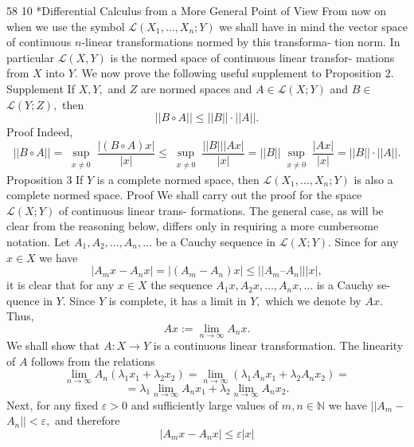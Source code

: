 58
10 *Differential Calculus from a More General Point of View
From now on when we use the symbol $\mathcal{L}(X_1, \ldots, X_n; Y)$ we shall have in mind
the vector space of continuous $n$-linear transformations normed by this transforma-
tion norm. In particular $\mathcal{L}(X, Y)$ is the normed space of continuous linear transfor-
mations from $X$ into $Y.$
We now prove the following useful supplement to Proposition 2.
Supplement If $X, Y,$ and $Z$ are normed spaces and $A \in \mathcal{L}(X; Y)$ and $B \in$
$\mathcal{L}(Y; Z),$ then
$$||B \circ A|| \le || B || \cdot || A ||.$$
Proof Indeed,
$$||B \circ A|| = \sup_{\substack{x \ne 0}} \frac{|(B \circ A)x|}{|x|} \le \sup_{\substack{x \ne 0}} \frac{|| B || |Ax|}{|x|} = || B || \sup_{\substack{x \ne 0}} \frac{|Ax|}{|x|} = || B ||\cdot || A ||.$$
Proposition 3 If $Y$ is a complete normed space, then $\mathcal{L}(X_1, \ldots, X_n; Y)$ is also a
complete normed space.
Proof We shall carry out the proof for the space $\mathcal{L}(X; Y)$ of continuous linear trans-
formations. The general case, as will be clear from the reasoning below, differs only
in requiring a more cumbersome notation.
Let $A_1, A_2, \ldots, A_n, \ldots$ be a Cauchy sequence in $\mathcal{L}(X; Y).$ Since for any $x \in X$
we have
$$|A_m x - A_n x| = |(A_m - A_n)x | \le || A_m – A_n|||x|,$$
it is clear that for any $x \in X$ the sequence $A_1x, A_2x, \ldots, A_nx, \ldots$ is a Cauchy se-
quence in $Y.$ Since $Y$ is complete, it has a limit in $Y,$ which we denote by $Ax.$
Thus,
$$Ax := \lim_{n\to\infty} A_nx.$$
We shall show that $A : X \to Y$ is a continuous linear transformation.
The linearity of $A$ follows from the relations
$$\lim_{n\to\infty} A_n(\lambda_1 x_1 + \lambda_2 x_2) = \lim_{n\to\infty} (\lambda_1 A_n x_1 + \lambda_2 A_n x_2) =$$
$$= \lambda_1 \lim_{n\to\infty} A_n x_1 + \lambda_2 \lim_{n\to\infty} A_n x_2.$$
Next, for any fixed $\varepsilon > 0$ and sufficiently large values of $m, n \in \mathbb{N}$ we have $||A_m -$
$A_n || < \varepsilon,$ and therefore
$$|A_m x - A_n x| \le \varepsilon |x|$$
